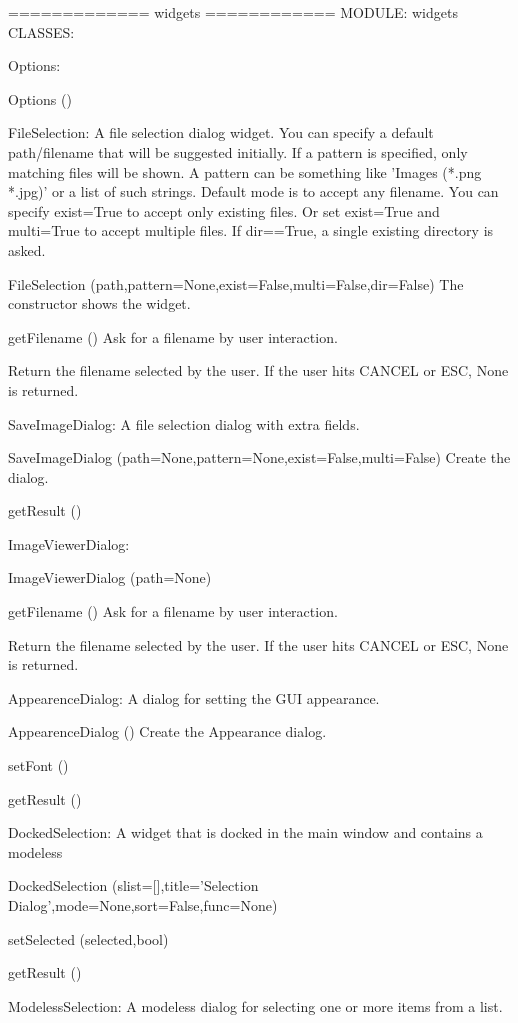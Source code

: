 ============= widgets ============
MODULE: widgets
CLASSES:

Options: 

Options ()


FileSelection: A file selection dialog widget.
    You can specify a default path/filename that will be suggested initially.
    If a pattern is specified, only matching files will be shown.
    A pattern can be something like 'Images (*.png *.jpg)' or a list
    of such strings.
    Default mode is to accept any filename. You can specify exist=True
    to accept only existing files. Or set exist=True and multi=True to
    accept multiple files.
    If dir==True, a single existing directory is asked.
    
FileSelection (path,pattern=None,exist=False,multi=False,dir=False)
The constructor shows the widget.

getFilename ()
Ask for a filename by user interaction.

        Return the filename selected by the user.
        If the user hits CANCEL or ESC, None is returned.
        

SaveImageDialog: A file selection dialog with extra fields.

SaveImageDialog (path=None,pattern=None,exist=False,multi=False)
Create the dialog.

getResult ()


ImageViewerDialog: 

ImageViewerDialog (path=None)


getFilename ()
Ask for a filename by user interaction.

        Return the filename selected by the user.
        If the user hits CANCEL or ESC, None is returned.
        

AppearenceDialog: A dialog for setting the GUI appearance.

AppearenceDialog ()
Create the Appearance dialog.

setFont ()


getResult ()


DockedSelection: A widget that is docked in the main window and contains a modeless
    
DockedSelection (slist=[],title='Selection Dialog',mode=None,sort=False,func=None)


setSelected (selected,bool)


getResult ()


ModelessSelection: A modeless dialog for selecting one or more items from a list.

